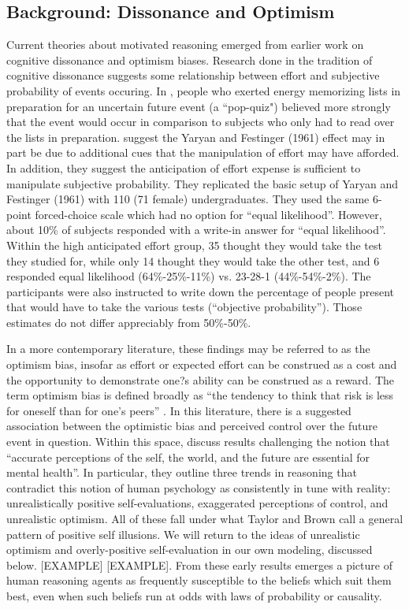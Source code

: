 \documentclass{article}
\begin{document}
\subsection{Background: Dissonance and Optimism}
Current theories about motivated reasoning emerged from earlier work on cognitive dissonance and optimism biases. Research done in the tradition of cognitive dissonance suggests some relationship between effort and subjective probability of events occuring. In \citet{Yaryan1961}, people who exerted energy memorizing lists in preparation for an uncertain future event (a ``pop-quiz") believed more strongly that the event would occur in comparison to subjects who only had to read over the lists in preparation. \citet{Arrowood1966} suggest the Yaryan and Festinger (1961) effect may in part be due to additional cues that the manipulation of effort may have afforded. In addition, they suggest the anticipation of effort expense is sufficient to manipulate subjective probability. They replicated the basic setup of Yaryan and Festinger (1961) with 110 (71 female) undergraduates. They used the same 6-point forced-choice scale which had no option for ``equal likelihood''. However, about 10\% of subjects responded with a write-in answer for ``equal likelihood''. Within the high anticipated effort group, 35 thought they would take the test they studied for, while only 14 thought they would take the other test, and 6 responded equal likelihood (64\%-25\%-11\%) vs. 23-28-1 (44\%-54\%-2\%). The participants were also instructed to write down the percentage of people present that would have to take the various tests (``objective probability''). Those estimates do not differ appreciably from 50\%-50\%. 

In a more contemporary literature, these findings may be referred to as the optimism bias, insofar as effort or expected effort can be construed as a cost and the opportunity to demonstrate one?s ability can be construed as a reward. The term optimism bias is defined broadly as ``the tendency to think that risk is less for oneself than for one's peers'' \citet{Klein2002}. In this literature, there is a suggested association between the optimistic bias and perceived control over the future event in question. Within this space, \citet{Taylor1988} discuss results challenging the notion that ``accurate perceptions of the self, the world, and the future are essential for mental health''. In particular, they outline three trends in reasoning that contradict this notion of human psychology as consistently in tune with reality: unrealistically positive self-evaluations, exaggerated perceptions of control, and unrealistic optimism. All of these fall under what Taylor and Brown call a general pattern of positive self illusions. We will return to the ideas of unrealistic optimism and overly-positive self-evaluation in our own modeling, discussed below. [EXAMPLE] [EXAMPLE]. From these early results emerges a picture of human reasoning agents as frequently susceptible to the beliefs which suit them best, even when such beliefs run at odds with laws of probability or causality. 
\end{document}
